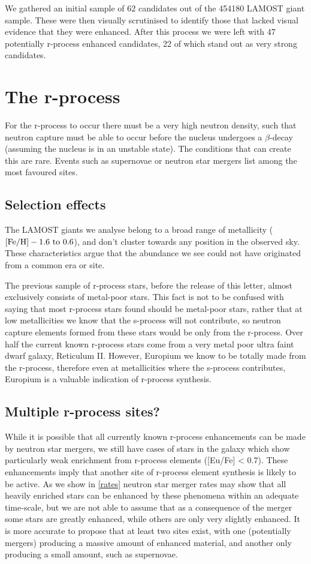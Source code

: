 \documentclass[a4paper,fleqn,usenatbib]{mnras}
\begin{document}
	We gathered an initial sample of 62 candidates out of the 454180 LAMOST giant sample. These were then visually scrutinised to identify those that lacked visual evidence that they were enhanced. After this process we were left with 47 potentially r-process enhanced candidates, 22 of which stand out as very strong candidates.
	
	\section{The r-process}
	For the r-process to occur there must be a very high neutron density, such that neutron capture must be able to occur before the nucleus undergoes a $\beta$-decay (assuming the nucleus is in an unstable state). The conditions that can create this are rare. Events such as supernovae or neutron star mergers list among the most favoured sites.
	
	\subsection{Selection effects}
	The LAMOST giants we analyse belong to a broad range of metallicity ($\rm{[Fe/H]} -1.6\ \rm{to}\ 0.6$), and don't cluster towards any position in the observed sky. These characteristics argue that the abundance we see could not have originated from a common era or site. 
	
	The previous sample of r-process stars, before the release of this letter, almost exclusively consists of metal-poor stars. This fact is not to be confused with saying that most r-process stars found should be metal-poor stars, rather that at low metallicities we know that the s-process will not contribute, so neutron capture elements formed from these stars would be only from the r-process. Over half the current known r-process stars come from a very metal poor ultra faint dwarf galaxy, Reticulum II. However, Europium we know to be totally made from the r-process, therefore even at metallicities where the s-process contributes, Europium is a valuable indication of r-process synthesis.
	
	\subsection{Multiple r-process sites?}
	While it is possible that all currently known r-process enhancements can be made by neutron star mergers, we still have cases of stars in the galaxy which show particularly weak enrichment from r-process elements ([Eu/Fe] < 0.7). These enhancements imply that another site of r-process element synthesis is likely to be active. As we show in \ref{rates}  neutron star merger rates may show that all heavily enriched stars can be enhanced by these phenomena within an adequate time-scale, but we are not able to assume that as a consequence of the merger some stars are greatly enhanced, while others are only very slightly enhanced. It is more accurate to propose that at least two sites exist, with one (potentially mergers) producing a massive amount of enhanced material, and another only producing a small amount, such as supernovae. 
	
\end{document}
